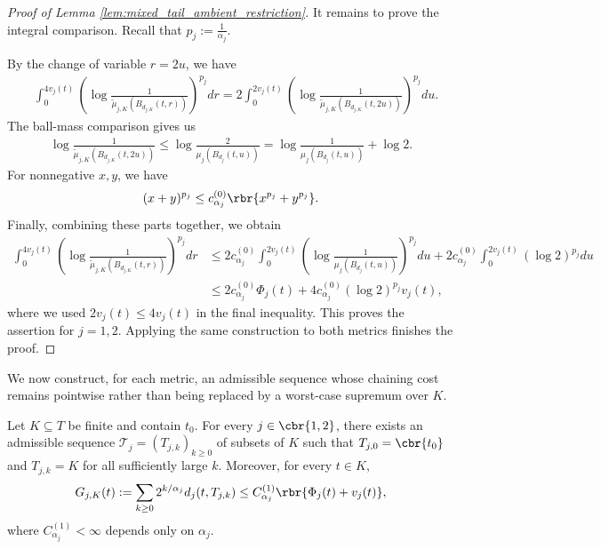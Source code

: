 \documentclass[11pt]{article}
\begin{document}
\begin{proof}[Proof of Lemma
\ref{lem:mixed_tail_ambient_restriction}]
It remains to prove the integral comparison. Recall that
$p_j:=\frac{1}{\alpha_j}$.

By the change of variable $r=2u$, we have
\begin{align*}
&\int_0^{4v_j(t)}
\left(
\log\frac{1}{
\widetilde\mu_{j,K}(B_{d_{j,K}}(t,r))
}
\right)^{p_j}dr=
2\int_0^{2v_j(t)}
\left(
\log\frac{1}{
\widetilde\mu_{j,K}(B_{d_{j,K}}(t,2u))
}
\right)^{p_j}du.
\end{align*}
The ball-mass comparison gives us
\begin{align*}
\log\frac{1}{
\widetilde\mu_{j,K}(B_{d_{j,K}}(t,2u))
}\le
\log\frac{2}{\mu_j(B_{d_j}(t,u))}=
\log\frac{1}{\mu_j(B_{d_j}(t,u))}
+
\log2.
\end{align*}
For nonnegative $x,y$, we have
\begin{align*}
(x+y)^{p_j}
\le
c_{\alpha_j}^{(0)}
\rbr{x^{p_j}+y^{p_j}}.
\end{align*}
Finally, combining these parts together, we obtain
\begin{align*}
\int_0^{4v_j(t)}
\left(
\log\frac{1}{
\widetilde\mu_{j,K}(B_{d_{j,K}}(t,r))
}
\right)^{p_j}dr&\le
2c_{\alpha_j}^{(0)}
\int_0^{2v_j(t)}
\left(
\log\frac{1}{\mu_j(B_{d_j}(t,u))}
\right)^{p_j}du+
2c_{\alpha_j}^{(0)}
\int_0^{2v_j(t)}(\log2)^{p_j}du\\
&\le
2c_{\alpha_j}^{(0)}\Phi_j(t)
+
4c_{\alpha_j}^{(0)}
(\log2)^{p_j}v_j(t),
\end{align*}
where we used $2v_j(t)\le4v_j(t)$ in the final inequality. This proves
the assertion for $j=1,2$. Applying the same construction to
both metrics finishes the proof.
\end{proof}

We now construct, for each metric, an admissible sequence whose
chaining cost remains pointwise rather than being replaced by a
worst-case supremum over $K$.

\begin{lemma}
\label{lem:mixed_tail_pointwise_measure_chain}
Let $K\subseteq T$ be finite and contain $t_0$. For every
$j\in\cbr{1,2}$, there exists an admissible sequence $\mathcal T_j=(T_{j,k})_{k\ge0}$ of subsets of $K$ such that $T_{j,0}=\cbr{t_0}$ and $T_{j,k}=K$ for all sufficiently large $k$. Moreover, for every
$t\in K$,
\begin{align*}
G_{j,K}(t):=
\sum_{k\ge0}
2^{k/\alpha_j}d_j(t,T_{j,k})\le
C_{\alpha_j}^{(1)}
\rbr{\Phi_j(t)+v_j(t)},
\end{align*}
where $C_{\alpha_j}^{(1)}<\infty$ depends only on $\alpha_j$.
\end{lemma}
\end{document}
